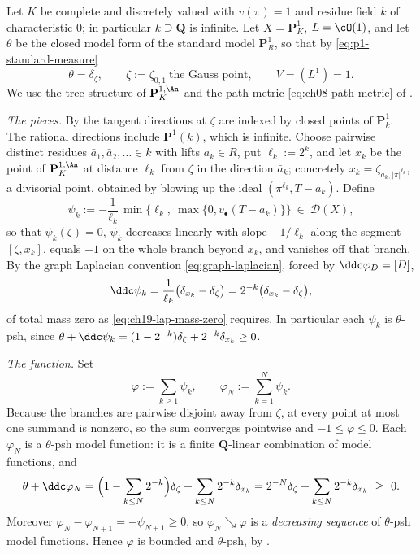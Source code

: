 \begin{example}
\label{ex:ch24-branch-sum}
Let $K$ be complete and discretely valued with $v(\pi)=1$ and residue
field $k$ of characteristic $0$; in particular $k\supseteq\mathbf Q$ is
infinite.  Let $X=\mathbf P^1_K$, $L=\cO(1)$, and let $\theta$ be the
closed model form of the standard model $\mathbf P^1_R$, so that by
\eqref{eq:p1-standard-measure}
\[
 \theta=\delta_{\zeta},\qquad \zeta:=\zeta_{0,1}
 \ \text{the Gauss point},\qquad V=(L^1)=1 .
\]
We use the tree structure of $\mathbf P^{1,\An}_K$ and the path metric
\eqref{eq:ch08-path-metric} of .

\emph{The pieces.}  By  the tangent directions at
$\zeta$ are indexed by closed points of $\mathbf P^1_k$.  The rational
directions include $\mathbf P^1(k)$, which is infinite.  Choose
pairwise distinct residues $\bar a_1,\bar a_2,\ldots\in k$ with lifts
$a_k\in R$, put $\ell_k:=2^k$, and let $x_k$ be the point of
$\mathbf P^{1,\An}_K$ at distance $\ell_k$ from $\zeta$ in the
direction $\bar a_k$; concretely $x_k=\zeta_{a_k,|\pi|^{\ell_k}}$, a
divisorial point, obtained by blowing up the ideal
$(\pi^{\ell_k},T-a_k)$.  Define
\[
 \psi_k:=-\frac1{\ell_k}\,
   \min\bigl\{\ell_k,\ \max\{0,v_\bullet(T-a_k)\}\bigr\}
   \ \in\ \mathcal D(X),
\]
so that $\psi_k(\zeta)=0$, $\psi_k$ decreases linearly with slope
$-1/\ell_k$ along the segment $[\zeta,x_k]$, equals $-1$ on the whole
branch beyond $x_k$, and vanishes off that branch.  By the graph
Laplacian convention \eqref{eq:graph-laplacian}, forced by
$\ddc\varphi_D=[D]$,
\[
 \ddc\psi_k=\frac1{\ell_k}\bigl(\delta_{x_k}-\delta_{\zeta}\bigr)
 =2^{-k}\bigl(\delta_{x_k}-\delta_{\zeta}\bigr),
\]
of total mass zero as \eqref{eq:ch19-lap-mass-zero} requires.  In
particular each $\psi_k$ is $\theta$-psh, since
$\theta+\ddc\psi_k=(1-2^{-k})\delta_\zeta+2^{-k}\delta_{x_k}\geq0$.

\emph{The function.}  Set
\[
 \varphi:=\sum_{k\geq1}\psi_k,
 \qquad
 \varphi_N:=\sum_{k=1}^{N}\psi_k .
\]
Because the branches are pairwise disjoint away from $\zeta$, at every
point at most one summand is nonzero, so the sum converges pointwise and
$-1\leq\varphi\leq0$.  Each $\varphi_N$ is a $\theta$-psh model
function: it is a finite $\mathbf Q$-linear combination of model functions,
and
\[
 \theta+\ddc\varphi_N
 =\Bigl(1-\sum_{k\leq N}2^{-k}\Bigr)\delta_\zeta
  +\sum_{k\leq N}2^{-k}\delta_{x_k}
 =2^{-N}\delta_\zeta+\sum_{k\leq N}2^{-k}\delta_{x_k}\ \geq\ 0 .
\]
Moreover $\varphi_N-\varphi_{N+1}=-\psi_{N+1}\geq0$, so
$\varphi_N\searrow\varphi$ is a \emph{decreasing sequence} of
$\theta$-psh model functions.  Hence $\varphi$ is bounded and
$\theta$-psh, by .


\end{example}

